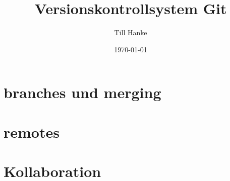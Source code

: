 \documentclass[a4paper]{article}
\title{Versionskontrollsystem Git}\let\Title\@title
\author{Till Hanke}          \let\Author\@author
\date{\today}           \let\Date\@date
\begin{document}

\newpage
\tableofcontents
\newpage


\newpage

%
\newpage

%
\section{branches und merging }
%
\section{remotes}
%
\section{Kollaboration}
%
\newpage
\nocite{*}

\printbibliography
\end{document}
